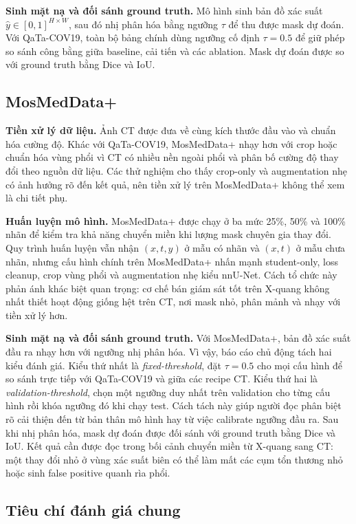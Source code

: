 \textbf{Sinh mặt nạ và đối sánh ground truth.} Mô hình sinh bản đồ xác suất \(\hat{y}\in[0,1]^{H\times W}\), sau đó nhị phân hóa bằng ngưỡng \(\tau\) để thu được mask dự đoán. Với QaTa-COV19, toàn bộ bảng chính dùng ngưỡng cố định \(\tau=0.5\) để giữ phép so sánh công bằng giữa baseline, cải tiến và các ablation. Mask dự đoán được so với ground truth bằng Dice và IoU.

\subsection{MosMedData+}

\textbf{Tiền xử lý dữ liệu.} Ảnh CT được đưa về cùng kích thước đầu vào và chuẩn hóa cường độ. Khác với QaTa-COV19, MosMedData+ nhạy hơn với crop hoặc chuẩn hóa vùng phổi vì CT có nhiều nền ngoài phổi và phân bố cường độ thay đổi theo nguồn dữ liệu. Các thử nghiệm cho thấy crop-only và augmentation nhẹ có ảnh hưởng rõ đến kết quả, nên tiền xử lý trên MosMedData+ không thể xem là chi tiết phụ.

\textbf{Huấn luyện mô hình.} MosMedData+ được chạy ở ba mức 25\%, 50\% và 100\% nhãn để kiểm tra khả năng chuyển miền khi lượng mask chuyên gia thay đổi. Quy trình huấn luyện vẫn nhận \((x,t,y)\) ở mẫu có nhãn và \((x,t)\) ở mẫu chưa nhãn, nhưng cấu hình chính trên MosMedData+ nhấn mạnh student-only, loss cleanup, crop vùng phổi và augmentation nhẹ kiểu nnU-Net. Cách tổ chức này phản ánh khác biệt quan trọng: cơ chế bán giám sát tốt trên X-quang không nhất thiết hoạt động giống hệt trên CT, nơi mask nhỏ, phân mảnh và nhạy với tiền xử lý hơn.

\textbf{Sinh mặt nạ và đối sánh ground truth.} Với MosMedData+, bản đồ xác suất đầu ra nhạy hơn với ngưỡng nhị phân hóa. Vì vậy, báo cáo chủ động tách hai kiểu đánh giá. Kiểu thứ nhất là \textit{fixed-threshold}, đặt \(\tau=0.5\) cho mọi cấu hình để so sánh trực tiếp với QaTa-COV19 và giữa các recipe CT. Kiểu thứ hai là \textit{validation-threshold}, chọn một ngưỡng duy nhất trên validation cho từng cấu hình rồi khóa ngưỡng đó khi chạy test. Cách tách này giúp người đọc phân biệt rõ cải thiện đến từ bản thân mô hình hay từ việc calibrate ngưỡng đầu ra. Sau khi nhị phân hóa, mask dự đoán được đối sánh với ground truth bằng Dice và IoU. Kết quả cần được đọc trong bối cảnh chuyển miền từ X-quang sang CT: một thay đổi nhỏ ở vùng xác suất biên có thể làm mất các cụm tổn thương nhỏ hoặc sinh false positive quanh rìa phổi.

\subsection{Tiêu chí đánh giá chung}

